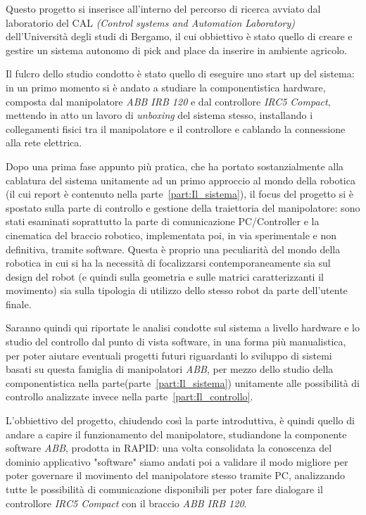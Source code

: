 Questo progetto si inserisce all'interno del percorso di ricerca avviato dal laboratorio del CAL \emph{(Control systems and Automation Laboratory)} dell'Università degli studi di Bergamo, il cui obbiettivo è stato quello di creare e gestire un sistema autonomo di pick and place da inserire in ambiente agricolo.

Il fulcro dello studio condotto è stato quello di eseguire uno start up del sistema: in un primo momento si è andato a studiare la componentistica hardware, composta dal manipolatore \emph{ABB IRB 120} e dal controllore \emph{IRC5 Compact}, mettendo in atto un lavoro di \emph{unboxing} del sistema stesso, installando i collegamenti fisici tra il manipolatore e il controllore e cablando la connessione alla rete elettrica.

Dopo una prima fase appunto più pratica, che ha portato sostanzialmente alla cablatura del sistema unitamente ad un primo approccio al mondo della robotica (il cui report è contenuto nella parte~\vref{part:Il_sistema}), il focus del progetto si è spostato sulla parte di controllo e gestione della traiettoria del manipolatore: sono stati esaminati soprattutto la parte di comunicazione PC/Controller e la cinematica del braccio robotico, implementata poi, in via sperimentale e non definitiva, tramite software. Questa è proprio una peculiarità del mondo della robotica in cui si ha la necessità di focalizzarsi contemporaneamente sia sul design del robot (e quindi sulla geometria e sulle matrici caratterizzanti il movimento) sia sulla tipologia di utilizzo dello stesso robot da parte dell'utente finale. 

Saranno quindi qui riportate le analisi condotte sul sistema a livello hardware e lo studio del controllo dal punto di vista software, in una forma più manualistica, per poter aiutare eventuali progetti futuri riguardanti lo sviluppo di sistemi basati su questa famiglia di manipolatori \emph{ABB}, per mezzo dello studio della componentistica nella parte(parte~\vref{part:Il_sistema}) unitamente alle possibilità di controllo analizzate invece nella parte~\vref{part:Il_controllo}.

L'obbiettivo del progetto, chiudendo così la parte introduttiva, è quindi quello di andare a capire il funzionamento del manipolatore, studiandone la componente software \emph{ABB}, prodotta in RAPID: una volta consolidata la conoscenza del dominio applicativo "software" siamo andati poi a validare il modo migliore per poter governare il movimento del manipolatore stesso tramite PC, analizzando tutte le possibilità di comunicazione disponibili per poter fare dialogare il controllore \emph{IRC5 Compact} con il braccio \emph{ABB IRB 120}.

